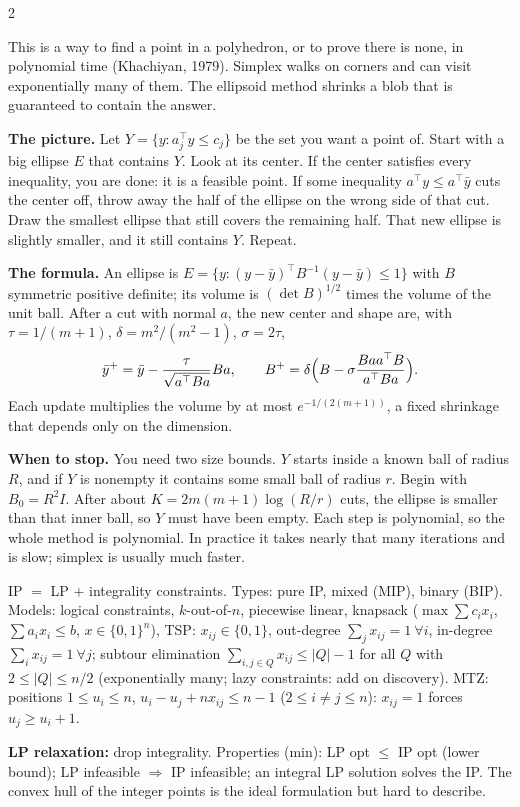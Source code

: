 \documentclass{article}
\newcommand{\sect}[1]{\par\vspace{1.2pt}{\fontsize{8}{9.2}\selectfont\textbf{#1}}\par\vspace{0.2pt}}
\newcommand{\kw}[1]{\textbf{#1}}
\begin{document}
\begin{multicols}{2}
\sect{5. The Ellipsoid Method}
This is a way to find a point in a polyhedron, or to prove there is none, in polynomial time (Khachiyan, 1979). Simplex walks on corners and can visit exponentially many of them. The ellipsoid method shrinks a blob that is guaranteed to contain the answer.

\kw{The picture.} Let $Y=\{y:a_j^\top y\le c_j\}$ be the set you want a point of. Start with a big ellipse $E$ that contains $Y$. Look at its center. If the center satisfies every inequality, you are done: it is a feasible point. If some inequality $a^\top y\le a^\top\bar y$ cuts the center off, throw away the half of the ellipse on the wrong side of that cut. Draw the smallest ellipse that still covers the remaining half. That new ellipse is slightly smaller, and it still contains $Y$. Repeat.

\kw{The formula.} An ellipse is $E=\{y:(y-\bar y)^\top B^{-1}(y-\bar y)\le 1\}$ with $B$ symmetric positive definite; its volume is $(\det B)^{1/2}$ times the volume of the unit ball. After a cut with normal $a$, the new center and shape are, with $\tau=1/(m+1)$, $\delta=m^2/(m^2-1)$, $\sigma=2\tau$,
\[
\bar y^+=\bar y-\frac{\tau}{\sqrt{a^\top Ba}}Ba,\qquad
B^+=\delta\Bigl(B-\sigma\frac{Baa^\top B}{a^\top Ba}\Bigr).
\]
Each update multiplies the volume by at most $e^{-1/(2(m+1))}$, a fixed shrinkage that depends only on the dimension.

\kw{When to stop.} You need two size bounds. $Y$ starts inside a known ball of radius $R$, and if $Y$ is nonempty it contains some small ball of radius $r$. Begin with $B_0=R^2 I$. After about $K=2m(m+1)\log(R/r)$ cuts, the ellipse is smaller than that inner ball, so $Y$ must have been empty. Each step is polynomial, so the whole method is polynomial. In practice it takes nearly that many iterations and is slow; simplex is usually much faster.

\sect{6. Integer Programming}
IP $=$ LP $+$ integrality constraints. Types: pure IP, mixed (MIP), binary (BIP). Models: logical constraints, $k$-out-of-$n$, piecewise linear, knapsack ($\max\sum c_i x_i$, $\sum a_i x_i\le b$, $x\in\{0,1\}^n$), TSP: $x_{ij}\in\{0,1\}$, out-degree $\sum_j x_{ij}=1\ \forall i$, in-degree $\sum_i x_{ij}=1\ \forall j$; subtour elimination $\sum_{i,j\in Q}x_{ij}\le|Q|-1$ for all $Q$ with $2\le|Q|\le n/2$ (exponentially many; lazy constraints: add on discovery). MTZ: positions $1\le u_i\le n$, $u_i-u_j+nx_{ij}\le n-1$ ($2\le i\neq j\le n$): $x_{ij}=1$ forces $u_j\ge u_i+1$.

\kw{LP relaxation:} drop integrality. Properties (min): LP opt $\le$ IP opt (lower bound); LP infeasible $\Rightarrow$ IP infeasible; an integral LP solution solves the IP. The convex hull of the integer points is the ideal formulation but hard to describe.


\end{multicols}
\end{document}
